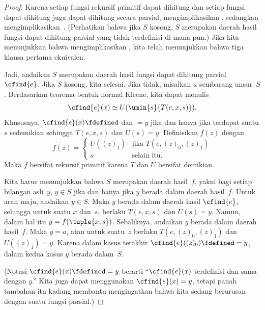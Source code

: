 \documentclass[../../../include/open-logic-section]{subfiles}
\begin{document}
\begin{proof}
Karena setiap fungsi rekursif primitif dapat dihitung dan setiap fungsi dapat
dihitung juga dapat dihitung secara parsial, 
mengimplikasikan , sedangkan 
mengimplikasikan~. (Perhatikan bahwa jika $S$ kosong,
$S$ merupakan daerah hasil fungsi dapat dihitung parsial yang tidak
terdefinisi di mana pun.) Jika kita menunjukkan bahwa 
mengimplikasikan , kita telah menunjukkan bahwa tiga
klausa pertama ekuivalen.

Jadi, andaikan $S$ merupakan daerah hasil fungsi dapat dihitung parsial
$\cfind{e}$. Jika $S$ kosong, kita selesai. Jika tidak, misalkan $a$ sembarang
unsur~$S$. Berdasarkan teorema bentuk normal Kleene, kita dapat menulis
\[
\cfind{e}(x) \simeq U(\umin{s}{T(e, x, s)}).
\]
Khususnya, $\cfind{e}(x) \fdefined$ dan $= y$ jika dan hanya jika terdapat
suatu $s$ sedemikian sehingga $T(e, x, s)$ dan $U(s) = y$. Definisikan $f(z)$
dengan
\[
f(z) = \begin{cases}
  U((z)_1) & \text{jika $T(e, (z)_0, (z)_1)$} \\
  a        & \text{selain itu.}
\end{cases}
\]
Maka $f$ bersifat rekursif primitif karena $T$ dan $U$ bersifat demikian.
\par

Kita harus menunjukkan bahwa $S$ merupakan daerah hasil~$f$, yakni bagi setiap
bilangan asli~$y$, $y \in S$ jika dan hanya jika $y$ berada dalam daerah
hasil~$f$. Untuk arah maju, andaikan $y \in S$. Maka $y$ berada dalam daerah
hasil $\cfind{e}$, sehingga untuk suatu $x$ dan~$s$, berlaku $T(e,x,s)$ dan
$U(s) = y$. Namun, dalam hal itu $y = f(\tuple{x,s})$. Sebaliknya, andaikan
$y$ berada dalam daerah hasil~$f$. Maka $y = a$, atau untuk suatu~$z$ berlaku
$T(e,(z)_0,(z)_1)$ dan $U((z)_1) = y$. Karena dalam kasus terakhir
$\cfind{e}((z)_0) \fdefined = y$, dalam kedua kasus $y$ berada dalam~$S$.

(Notasi $\cfind{e}(x) \fdefined = y$ berarti ``$\cfind{e}(x)$ terdefinisi dan
sama dengan $y$.'' Kita juga dapat menggunakan $\cfind{e}(x) = y$, tetapi
panah tambahan itu kadang membantu mengingatkan bahwa kita sedang berurusan
dengan suatu fungsi parsial.)


\end{proof}
\end{document}
